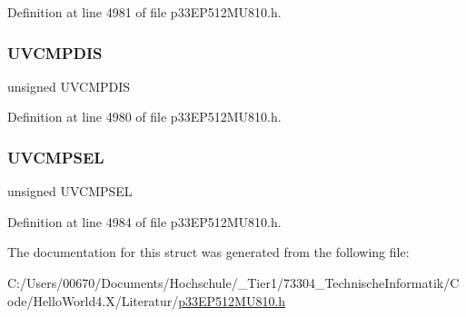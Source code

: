 Definition at line 4981 of file p33\+E\+P512\+M\+U810.\+h.

\mbox{\label{structtag_u1_c_n_f_g2_b_i_t_s_a12e30041e1e8340c90e43f0768784eac}} 
\subsubsection{\texorpdfstring{U\+V\+C\+M\+P\+D\+IS}{UVCMPDIS}}
{\footnotesize\ttfamily unsigned U\+V\+C\+M\+P\+D\+IS}



Definition at line 4980 of file p33\+E\+P512\+M\+U810.\+h.

\mbox{\label{structtag_u1_c_n_f_g2_b_i_t_s_a98c9d1d96926affd76c0fd386d8abb68}} 
\subsubsection{\texorpdfstring{U\+V\+C\+M\+P\+S\+EL}{UVCMPSEL}}
{\footnotesize\ttfamily unsigned U\+V\+C\+M\+P\+S\+EL}



Definition at line 4984 of file p33\+E\+P512\+M\+U810.\+h.



The documentation for this struct was generated from the following file\+:\begin{DoxyCompactItemize}
\item 
C\+:/\+Users/00670/\+Documents/\+Hochschule/\+\_\+\+Tier1/73304\+\_\+\+Technische\+Informatik/\+Code/\+Hello\+World4.\+X/\+Literatur/\hyperlink{p33_e_p512_m_u810_8h}{p33\+E\+P512\+M\+U810.\+h}\end{DoxyCompactItemize}
